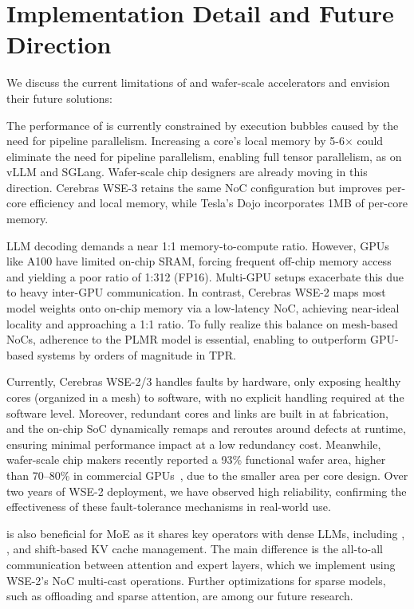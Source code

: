 \vspace{-0.3cm}
\section{Implementation Detail and Future Direction}

We discuss the current limitations of \sys and wafer-scale accelerators and envision their future solutions:

 The performance of \sys is currently constrained by execution bubbles caused by the need for pipeline parallelism. Increasing a core's local memory by 5-6$\times$ could eliminate the need for pipeline parallelism, enabling full tensor parallelism, as on vLLM and SGLang. Wafer-scale chip designers are already moving in this direction. Cerebras WSE-3 retains the same NoC configuration but improves per-core efficiency and local memory, while Tesla’s Dojo incorporates 1MB of per-core memory.

 LLM decoding demands a near 1:1 memory-to-compute ratio. However, GPUs like A100 have limited on-chip SRAM, forcing frequent off-chip memory access and yielding a poor ratio of 1:312 (FP16). Multi-GPU setups exacerbate this due to heavy inter-GPU communication. 
In contrast, Cerebras WSE-2 maps most model weights onto on-chip memory via a low-latency NoC, achieving near-ideal locality and approaching a 1:1 ratio. To fully realize this balance on mesh-based NoCs, adherence to the PLMR model is essential, enabling \sys to outperform GPU-based systems by orders of magnitude in TPR.

 Currently, Cerebras WSE-2/3 handles faults by hardware, only exposing healthy cores (organized in a mesh) to software, with no explicit handling required at the software level. Moreover, redundant cores and links are built in at fabrication, and the on-chip SoC dynamically remaps and reroutes around defects at runtime, ensuring minimal performance impact at a low redundancy cost. Meanwhile, wafer-scale chip makers recently reported a 93\% functional wafer area, higher than 70–80\% in commercial GPUs~\cite{cerebras_defect_tolerance}, due to the smaller area per core design. Over two years of WSE-2 deployment, we have observed high reliability, confirming the effectiveness of these fault-tolerance mechanisms in real-world use.

 \sys is also beneficial for MoE as it shares key operators with dense LLMs, including \gemm, \gemv, and shift-based KV cache management. The main difference is the all-to-all communication between attention and expert layers, which we implement using WSE-2's NoC multi-cast operations. Further optimizations for sparse models, such as offloading and sparse attention, are among our future research.

